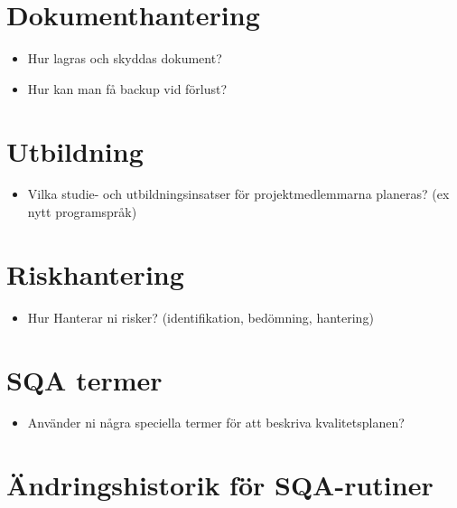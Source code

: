 \section{Dokumenthantering}
\begin{itemize}
\item Hur lagras och skyddas dokument?
\item Hur kan man få backup vid förlust?
\end{itemize}

\section{Utbildning}
\begin{itemize}
\item Vilka studie- och utbildningsinsatser för projektmedlemmarna planeras? (ex nytt programspråk)
\end{itemize}

\section{Riskhantering}
\begin{itemize}
\item Hur Hanterar ni risker? (identifikation, bedömning, hantering)
\end{itemize}

\section{SQA termer}
\begin{itemize}
\item Använder ni några speciella termer för att beskriva kvalitetsplanen?
\end{itemize}

\section{Ändringshistorik för SQA-rutiner}


